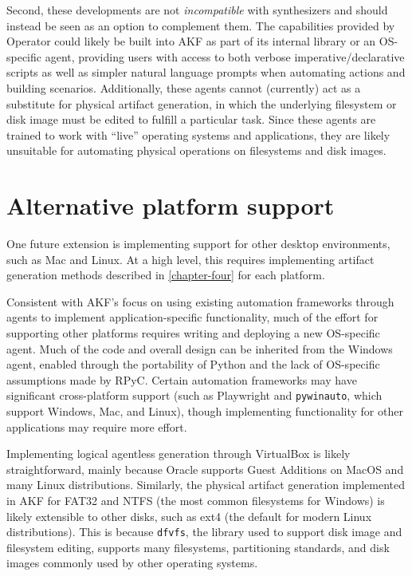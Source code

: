 Second, these developments are not \emph{incompatible} with synthesizers
and should instead be seen as an option to complement them. The
capabilities provided by Operator could likely be built into AKF as part
of its internal library or an OS-specific agent, providing users with
access to both verbose imperative/declarative scripts as well as simpler
natural language prompts when automating actions and building scenarios.
Additionally, these agents cannot (currently) act as a substitute for
physical artifact generation, in which the underlying filesystem or disk
image must be edited to fulfill a particular task. Since these agents
are trained to work with ``live'' operating systems and applications,
they are likely unsuitable for automating physical operations on
filesystems and disk images.

\section{Alternative platform
support}\label{alternative-platform-support}

One future extension is implementing support for other desktop
environments, such as Mac and Linux. At a high level, this requires
implementing artifact generation methods described in \autoref{chapter-four} for each platform.

Consistent with AKF's focus on using existing automation frameworks
through agents to implement application-specific functionality, much of
the effort for supporting other platforms requires writing and deploying
a new OS-specific agent. Much of the code and overall design can be
inherited from the Windows agent, enabled through the portability of
Python and the lack of OS-specific assumptions made by RPyC. Certain
automation frameworks may have significant cross-platform support (such
as Playwright and \passthrough{\lstinline!pywinauto!}, which support
Windows, Mac, and Linux), though implementing functionality for other
applications may require more effort.

Implementing logical agentless generation through VirtualBox is likely
straightforward, mainly because Oracle supports Guest Additions on MacOS
and many Linux distributions. Similarly, the physical artifact
generation implemented in AKF for FAT32 and NTFS (the most common
filesystems for Windows) is likely extensible to other disks, such as
ext4 (the default for modern Linux distributions). This is because
\passthrough{\lstinline!dfvfs!}, the library used to support disk image
and filesystem editing, supports many filesystems, partitioning
standards, and disk images commonly used by other operating systems.

